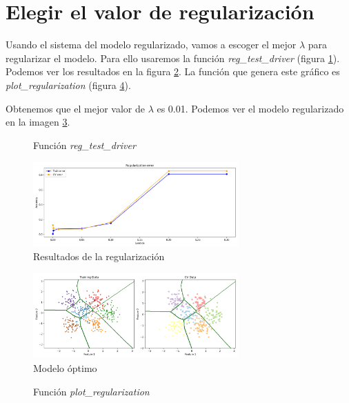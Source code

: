 \documentclass[6pt]{../../shared/AiTex}
\begin{document}
\section{Elegir el valor de regularización}

Usando el sistema del modelo regularizado, vamos a escoger el mejor $\lambda$ para regularizar el modelo. Para ello usaremos la función \textit{reg\_test\_driver} (figura \ref{fig:reg_test_driver}). Podemos ver los resultados en la figura \ref{fig:lambda_results}. La función que genera este gráfico es \textit{plot\_regularization} (figura \ref{fig:plot_regularization}).

Obtenemos que el mejor valor de $\lambda$ es 0.01. Podemos ver el modelo regularizado en la imagen \ref{fig:optim_res}.

\begin{figure}[H]
    \centering
    
    \caption{Función \textit{reg\_test\_driver}}
    \label{fig:reg_test_driver}
\end{figure}

\begin{figure}[H]
    \centering
    \includegraphics[width=0.7\textwidth]{./images/tuning.png}
    \caption{Resultados de la regularización}
    \label{fig:lambda_results}
\end{figure}

\begin{figure}[H]
    \centering
    \includegraphics[width=0.7\textwidth]{./images/decision_boundary_regularized_optimal.png}
    \caption{Modelo óptimo}
    \label{fig:optim_res}
\end{figure}

\begin{figure}[H]
    \centering
    
    \caption{Función \textit{plot\_regularization}}
    \label{fig:plot_regularization}
\end{figure}
\end{document}
